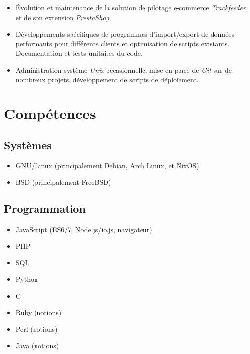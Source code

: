 \documentclass[a4paper]{article}
\begin{document}
\begin{itemize}
  \item Évolution et maintenance de la solution de pilotage e-commerce
  \textit{Trackfeeder} et de son extension \textit{PrestaShop}.
  \item Développements spécifiques de programmes d'import/export de
  données performants pour différents clients et optimisation de scripts
  existants. Documentation et tests unitaires du code.
  \item Administration système \textit{Unix} occasionnelle, mise en
  place de \textit{Git} sur de nombreux projets, développement de
  scripts de déploiement.

\end{itemize}



\clearpage

\section*{Compétences}

\subsection*{Systèmes}

\begin{itemize}
  \item GNU/Linux (principalement Debian, Arch Linux, et NixOS)
  \item BSD (principalement FreeBSD)
\end{itemize}

\subsection*{Programmation}

\begin{itemize}
  \item JavaScript (ES6/7, Node.js/io.js, navigateur)
  \item PHP
  \item SQL
  \item Python
  \item C
  \item Ruby (notions)
  \item Perl (notions)
  \item Java (notions)
\end{itemize}
\end{document}
